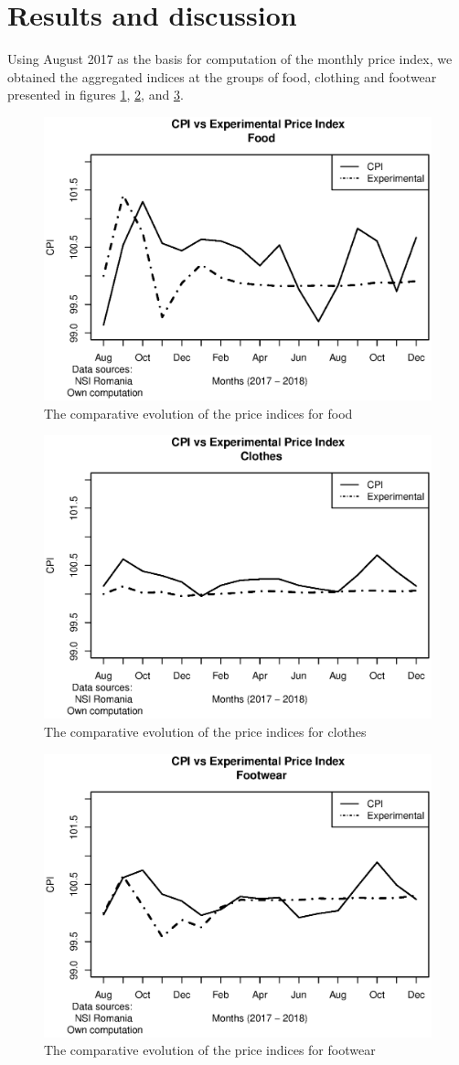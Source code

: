 \documentclass[]{article}
\begin{document}
\section{Results and discussion } \label{results}


Using August 2017 as the basis for computation of the monthly price index, we obtained the aggregated indices at the 
groups of food, clothing and footwear presented in figures \ref{fig:4}, \ref{fig:5}, and \ref{fig:6}.


\begin{figure}
\centering
\includegraphics[width=0.7\linewidth]{fig3.eps}
\caption{The comparative evolution of the price indices for food}
\label{fig:4}
\end{figure}


\begin{figure}
\centering
\includegraphics[width=0.7\linewidth]{fig4.eps}
\caption{The comparative evolution of the price indices for clothes}
\label{fig:5}
\end{figure}


\begin{figure}
\centering
\includegraphics[width=0.7\linewidth]{fig5.eps}
\caption{The comparative evolution of the price indices for footwear}
\label{fig:6}
\end{figure}
\end{document}

